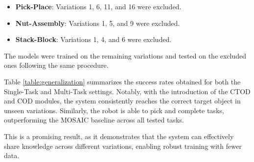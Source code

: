 \begin{itemize}
    \item \textbf{Pick-Place}: Variations 1, 6, 11, and 16 were excluded.
    \item \textbf{Nut-Assembly}: Variations 1, 5, and 9 were excluded.
    \item \textbf{Stack-Block}: Variations 1, 4, and 6 were excluded.
\end{itemize}

The models were trained on the remaining variations and tested on the excluded ones following the same procedure.

Table \ref{table:generalization} summarizes the success rates obtained for both the Single-Task and Multi-Task settings. Notably, with the introduction of the CTOD and COD modules, the system consistently reaches the correct target object in unseen variations. Similarly, the robot is able to pick and complete tasks, outperforming the MOSAIC baseline across all tested tasks.

This is a promising result, as it demonstrates that the system can effectively share knowledge across different variations, enabling robust training with fewer data.


